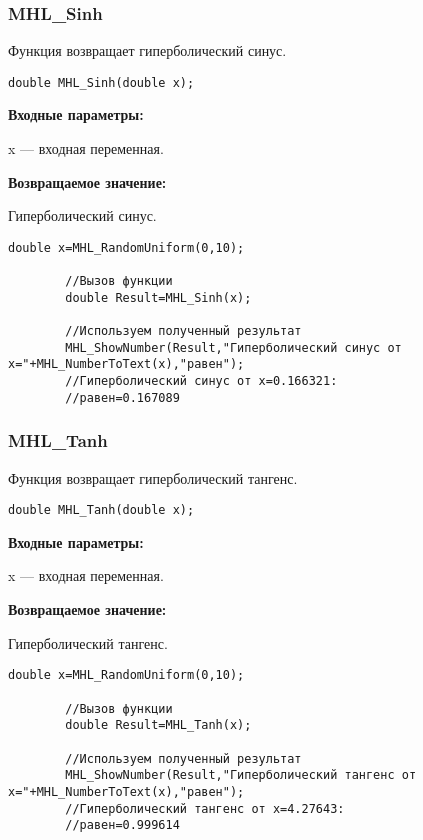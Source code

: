 \documentclass[a4paper,12pt]{article}
\begin{document}
\subsubsection{MHL\_Sinh}\label{MHL_Sinh}

Функция возвращает гиперболический синус.


\begin{lstlisting}[label=code_syntax_MHL_Sinh,caption=Синтаксис]
double MHL_Sinh(double x);
\end{lstlisting}

\textbf{Входные параметры:}

 x --- входная переменная.

\textbf{Возвращаемое значение:}

Гиперболический синус.


\begin{lstlisting}[label=code_use_MHL_Sinh,caption=Пример использования]
        double x=MHL_RandomUniform(0,10);

        //Вызов функции
        double Result=MHL_Sinh(x);

        //Используем полученный результат
        MHL_ShowNumber(Result,"Гиперболический синус от x="+MHL_NumberToText(x),"равен");
        //Гиперболический синус от x=0.166321:
        //равен=0.167089
\end{lstlisting}

\subsubsection{MHL\_Tanh}\label{MHL_Tanh}

Функция возвращает гиперболический тангенс.


\begin{lstlisting}[label=code_syntax_MHL_Tanh,caption=Синтаксис]
double MHL_Tanh(double x);
\end{lstlisting}

\textbf{Входные параметры:}

 x --- входная переменная.

\textbf{Возвращаемое значение:}

Гиперболический тангенс.


\begin{lstlisting}[label=code_use_MHL_Tanh,caption=Пример использования]
        double x=MHL_RandomUniform(0,10);

        //Вызов функции
        double Result=MHL_Tanh(x);

        //Используем полученный результат
        MHL_ShowNumber(Result,"Гиперболический тангенс от x="+MHL_NumberToText(x),"равен");
        //Гиперболический тангенс от x=4.27643:
        //равен=0.999614
\end{lstlisting}
\end{document}
